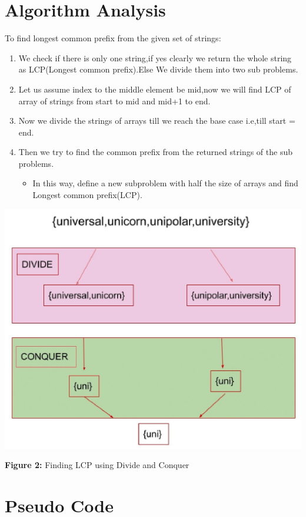 \documentclass{article}
\begin{document}
\begin{multicols}{2}
\section{Algorithm Analysis}
To find longest common prefix from the given set of strings:
 
\begin{enumerate}
\item We check if there is only one string,if yes clearly we return the whole string as LCP(Longest common prefix).Else We divide them into two sub problems.
\item Let us assume index to the middle element be mid,now we will find LCP of array of strings from start to mid and mid+1 to end.
\item Now we divide the strings of arrays till we reach the base case i.e,till start = end.
\item Then we try to find the common prefix from the returned strings of the sub problems.
\begin{itemize}
\item In this way, define a new subproblem with half the size of arrays and find Longest common prefix(LCP).
\end{itemize}
\end{enumerate}


\includegraphics[scale=0.20]{example_as04.jpg}
\begin{center}\textbf{Figure 2:} Finding LCP using Divide and Conquer\end{center}

\section{Pseudo Code}


\end{multicols}
\end{document}
